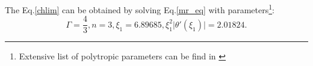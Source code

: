 \documentclass[oneside,a4paper,11pt]{report}
\begin{document}
The Eq.\eqref{chlim} can be obtained by solving Eq.\eqref{mr_eq} with parameters\footnote{Extensive list of polytropic parameters can be find in
\citet{1939MNRAS..99..673C}}:
\begin{equation}
\Gamma = \frac{4}{3}, n =3,{   }\xi_1 = 6.89685, \xi_1^2 \lvert \theta' (\xi_1) \lvert = 2.01824. 
\end{equation}
                                                                                                                                                                                                                                                                                                                                                                                                                                                                                                                                                                                                                                                                                                                                                                                                                                                                                                                                                                                                                                                                                                                                                                                                                                                                                                                                                                                                                                                                                                                                                                                                                                                                                                                                                                                                                                                                                                                                                                                                                                                                                                                                                                                                                                                                                                                                                                                                                                                                                                                                                                                                                                                                                                                                                                                                                                                                                                                                                                                                                      
\end{document}

